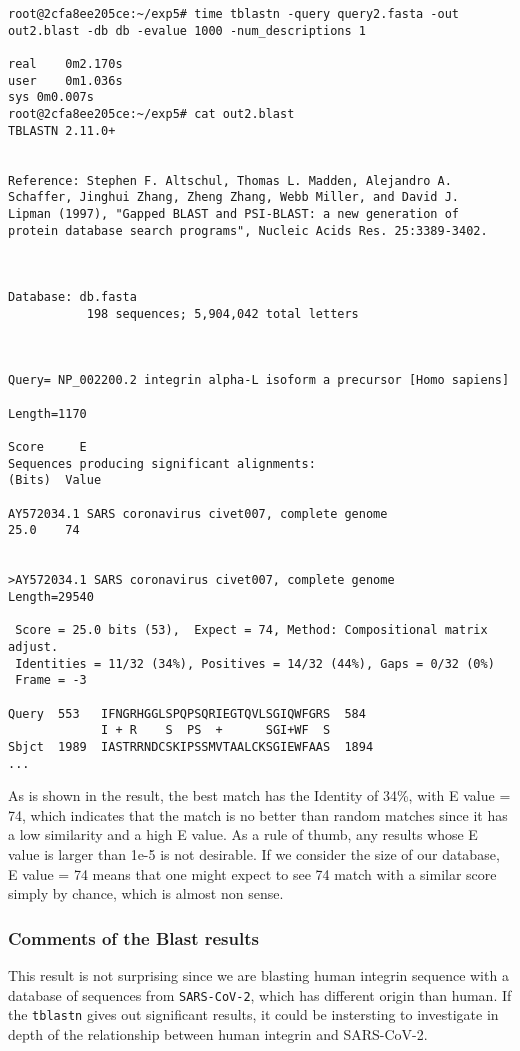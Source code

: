 \documentclass[en,black,10pt,normal]{elegantnote}
\begin{document}
\begin{lstlisting}
root@2cfa8ee205ce:~/exp5# time tblastn -query query2.fasta -out out2.blast -db db -evalue 1000 -num_descriptions 1

real	0m2.170s
user	0m1.036s
sys	0m0.007s
root@2cfa8ee205ce:~/exp5# cat out2.blast 
TBLASTN 2.11.0+


Reference: Stephen F. Altschul, Thomas L. Madden, Alejandro A.
Schaffer, Jinghui Zhang, Zheng Zhang, Webb Miller, and David J.
Lipman (1997), "Gapped BLAST and PSI-BLAST: a new generation of
protein database search programs", Nucleic Acids Res. 25:3389-3402.



Database: db.fasta
           198 sequences; 5,904,042 total letters



Query= NP_002200.2 integrin alpha-L isoform a precursor [Homo sapiens]

Length=1170
                                                                      Score     E
Sequences producing significant alignments:                          (Bits)  Value

AY572034.1 SARS coronavirus civet007, complete genome                 25.0    74   


>AY572034.1 SARS coronavirus civet007, complete genome
Length=29540

 Score = 25.0 bits (53),  Expect = 74, Method: Compositional matrix adjust.
 Identities = 11/32 (34%), Positives = 14/32 (44%), Gaps = 0/32 (0%)
 Frame = -3

Query  553   IFNGRHGGLSPQPSQRIEGTQVLSGIQWFGRS  584
             I + R    S  PS  +      SGI+WF  S
Sbjct  1989  IASTRRNDCSKIPSSMVTAALCKSGIEWFAAS  1894
...
\end{lstlisting}
As is shown in the result, the best match has the Identity of 34\%, with E value = 74,
which indicates that the match is no better than random matches since it has a low similarity
and a high E value. As a rule of thumb, any results whose E value is larger than 1e-5 is
not desirable. If we consider the size of our database, E value = 74 means that one might expect to see 74 match with a similar score simply by chance,
which is almost non sense.

\subsubsection{Comments of the Blast results}
This result is not surprising since we are blasting human integrin sequence with a database
of sequences from \lstinline{SARS-CoV-2}, which has different origin than human. 
If the \lstinline{tblastn} gives out significant
results, it could be instersting to investigate in depth of the relationship between
human integrin and SARS-CoV-2.
\end{document}
